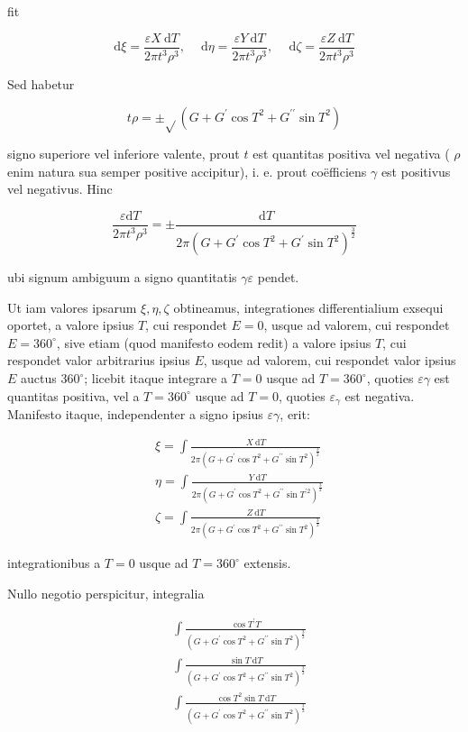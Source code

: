 \documentclass[10pt]{article}
\begin{document}
fit

\[
\mathrm{d} \xi=\frac{\varepsilon X \mathrm{~d} T}{2 \pi t^{3} \rho^{3}}, \quad \mathrm{~d} \eta=\frac{\varepsilon Y \mathrm{~d} T}{2 \pi t^{3} \rho^{3}}, \quad \mathrm{~d} \zeta=\frac{\varepsilon Z \mathrm{~d} T}{2 \pi t^{3} \rho^{3}}
\]

Sed habetur

\[
t \rho= \pm \sqrt{ }\left(G+G^{\prime} \cos T^{2}+G^{\prime \prime} \sin T^{2}\right)
\]

signo superiore vel inferiore valente, prout \(t\) est quantitas positiva vel negativa ( \(\rho\) enim natura sua semper positive accipitur), i. e. prout coëfficiens \(\gamma\) est positivus vel negativus. Hinc

\[
\frac{\varepsilon \mathrm{d} T}{2 \pi t^{3} \rho^{3}}= \pm \frac{\mathrm{d} T}{2 \pi\left(G+G^{\prime} \cos T^{2}+G^{\prime} \sin T^{2}\right)^{\frac{3}{2}}}
\]

ubi signum ambiguum a signo quantitatis \(\gamma \varepsilon\) pendet.

Ut iam valores ipsarum \(\xi, \eta, \zeta\) obtineamus, integrationes differentialium exsequi oportet, a valore ipsius \(T\), cui respondet \(E=0\), usque ad valorem, cui respondet \(E=360^{\circ}\), sive etiam (quod manifesto eodem redit) a valore ipsius \(T\), cui respondet valor arbitrarius ipsius \(E\), usque ad valorem, cui respondet valor ipsius \(E\) auctus \(360^{\circ}\); licebit itaque integrare a \(T=0\) usque ad \(T=360^{\circ}\), quoties \(\varepsilon \gamma\) est quantitas positiva, vel a \(T=360^{\circ}\) usque ad \(T=0\), quoties \(\varepsilon_{\gamma}\) est negativa. Manifesto itaque, independenter a signo ipsius \(\varepsilon \gamma\), erit:

\[
\begin{aligned}
& \xi=\int \frac{X \mathrm{~d} T}{2 \pi\left(G+G^{\prime} \cos T^{2}+G^{\prime \prime} \sin T^{2}\right)^{\frac{3}{2}}} \\
& \eta=\int \frac{Y \mathrm{~d} T}{2 \pi\left(G+G^{\prime} \cos T^{2}+G^{\prime \prime} \sin T^{\prime 2}\right)^{\frac{3}{2}}} \\
& \zeta=\int \frac{Z \mathrm{~d} T}{2 \pi\left(G+G^{\prime} \cos T^{2}+G^{\prime \prime} \sin T^{2}\right)^{\frac{3}{2}}}
\end{aligned}
\]

integrationibus a \(T=0\) usque ad \(T=360^{\circ}\) extensis.

Nullo negotio perspicitur, integralia

\[
\begin{aligned}
& \int \frac{\cos T^{\prime} T}{\left(G+G^{\prime} \cos T^{2}+G^{\prime \prime} \sin T^{2}\right)^{\frac{3}{2}}} \\
& \int \frac{\sin T \mathrm{~d} T}{\left(G+G^{\prime} \cos T^{2}+G^{\prime \prime} \sin T^{2}\right)^{\frac{3}{2}}} \\
& \int \frac{\cos T^{2} \sin T \mathrm{~d} T}{\left(G+G^{\prime} \cos T^{2}+G^{\prime \prime} \sin T^{2}\right)^{\frac{3}{2}}}
\end{aligned}
\]
\end{document}
